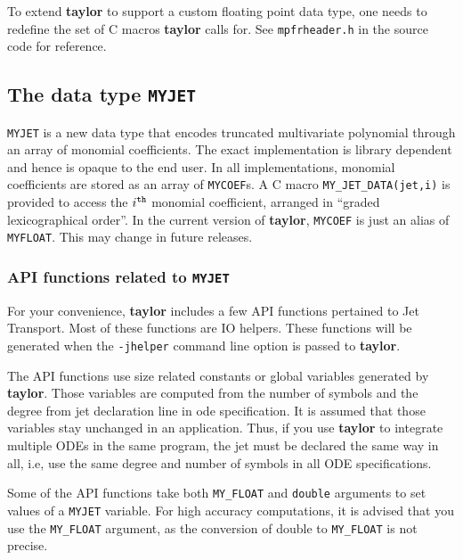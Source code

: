 \documentclass[10pt]{article}
\theoremstyle{remark}
\newcommand{\taylorname}{{\bf taylor}}
\newcommand{\myfloat}{{\tt MY\symbol{95}FLOAT}}
\newcommand{\myjet}{{\tt MY\symbol{95}JET}}
\newcommand{\mycoef}{{\tt MY\symbol{95}COEF}}
\begin{document}
\bigskip
To extend \taylorname{} to support a custom floating point data type,
one needs to redefine the set of C macros \taylorname{} calls for. See
{\tt{mpfrheader.h}} in the source code for reference.


\subsection{The data type \myjet{}} \label{sec:myjet}
\myjet{} is a new data type that encodes truncated multivariate
polynomial through an array of monomial coefficients. The exact
implementation is library dependent and hence is opaque to the end
user. In all implementations, monomial coefficients are stored as an
array of \mycoef{}s. A C macro \verb+MY_JET_DATA(jet,i)+ is provided
to access the $i^{{\tt th}}$ monomial coefficient, arranged in
``graded lexicographical order''.  In the current version of
\taylorname{}, \mycoef{} is just an alias of \myfloat{}. This may
change in future releases.

\subsubsection*{API functions related to \myjet{}} \label{sec:myjetapi}
For your convenience, \taylorname{} includes a few API functions
pertained to Jet Transport. Most of these functions are IO
helpers. These functions will be generated when the \verb+-jhelper+
command line option is passed to \taylorname{}.

\bigskip
The API functions use size related constants or global variables
generated by \taylorname{}. Those variables are computed from the
number of symbols and the degree from jet declaration line in ode
specification.  It is assumed that those variables stay unchanged in
an application. Thus, if you use \taylorname{} to integrate multiple
ODEs in the same program, the jet must be declared the same way in
all, i.e, use the same degree and number of symbols in all ODE
specifications.

\bigskip
Some of the API functions take both \verb+MY_FLOAT+ and \verb+double+
arguments to set values of a \myjet{} variable.  For high accuracy
computations, it is advised that you use the \verb+MY_FLOAT+ argument,
as the conversion of double to \verb+MY_FLOAT+ is not precise.
\end{document}
